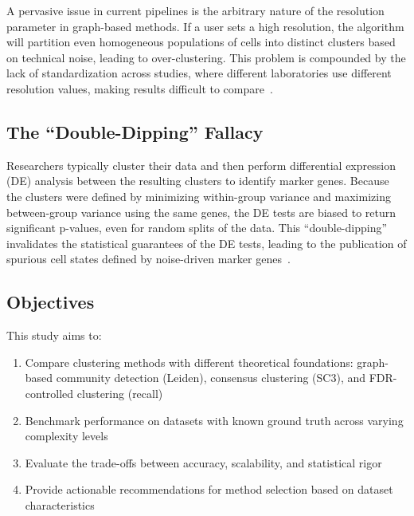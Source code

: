A pervasive issue in current pipelines is the arbitrary nature of the resolution parameter in graph-based methods. If a user sets a high resolution, the algorithm will partition even homogeneous populations of cells into distinct clusters based on technical noise, leading to over-clustering. This problem is compounded by the lack of standardization across studies, where different laboratories use different resolution values, making results difficult to compare~\cite{xu2025scclubench}.

\subsection{The ``Double-Dipping'' Fallacy}

Researchers typically cluster their data and then perform differential expression (DE) analysis between the resulting clusters to identify marker genes. Because the clusters were defined by minimizing within-group variance and maximizing between-group variance using the same genes, the DE tests are biased to return significant p-values, even for random splits of the data. This ``double-dipping'' invalidates the statistical guarantees of the DE tests, leading to the publication of spurious cell states defined by noise-driven marker genes~\cite{denadel2024recall}.

\subsection{Objectives}

This study aims to:
\begin{enumerate}[noitemsep]
    \item Compare clustering methods with different theoretical foundations: graph-based community detection (Leiden), consensus clustering (SC3), and FDR-controlled clustering (recall)
    \item Benchmark performance on datasets with known ground truth across varying complexity levels
    \item Evaluate the trade-offs between accuracy, scalability, and statistical rigor
    \item Provide actionable recommendations for method selection based on dataset characteristics
\end{enumerate}
